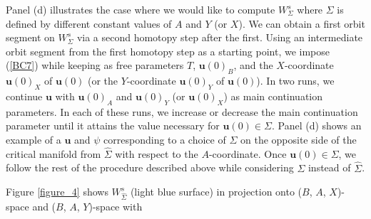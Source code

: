\documentclass{ws-ijbc}
\begin{document}
Panel (d) illustrates the case where we would like to compute $W^{s}_{\Sigma}$ where $\Sigma$ is defined by different constant values of $A$ and $Y$ (or $X$).  We can obtain a first orbit segment on $W^{s}_{\Sigma}$ via a second homotopy step after the first.  Using an intermediate orbit segment from the first homotopy step as a starting point, we impose (\ref{BC7}) while keeping as free parameters $T$, $\mathbf{u}(0)_B$, and the $X$-coordinate $\mathbf{u}(0)_X$ of $\mathbf{u}(0)$ (or the $Y$-coordinate  $\mathbf{u}(0)_Y$ of $\mathbf{u}(0)$).  In two runs, we continue $\mathbf{u}$ with $\mathbf{u}(0)_A$ and $\mathbf{u}(0)_Y$ (or $\mathbf{u}(0)_X$) as main continuation parameters.  In each of these runs, we increase or decrease the main continuation parameter until it attains the value necessary for $\mathbf{u}(0) \in \Sigma$.  Panel (d) shows an example of a $\mathbf{u}$ and $\psi$ corresponding to a choice of $\Sigma$ on the opposite side of the critical manifold from $\widehat{\Sigma}$ with respect to the $A$-coordinate.  Once $\mathbf{u}(0) \in \Sigma$, we follow the rest of the procedure described above while considering $\Sigma$ instead of $\widehat{\Sigma}$.

Figure \ref{figure_4} shows $W^s_{\widehat{\Sigma}}$ (light blue surface) in projection onto ($B$, $A$, $X$)-space and ($B$, $A$, $Y$)-space with 
\end{document}
